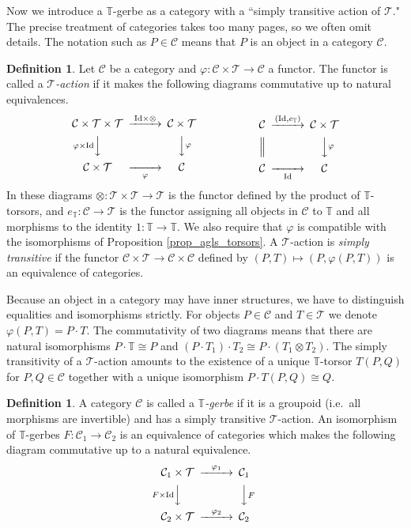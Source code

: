 \documentclass[a4paper,a4paper]{article}
\theoremstyle{definition}
\newtheorem{dfn}[thm]{Definition}
\theoremstyle{remark}
\newcommand{\T}{\mathbb{T}}
\newcommand{\sC}{\mathcal{C}}
\newcommand{\sT}{\mathcal{T}}
\newcommand{\Id}{\mathrm{Id}}
\begin{document}
Now we introduce a $\T$-gerbe as a category with a ``simply transitive action of $\sT$." The precise treatment of categories takes too many pages, so we often omit details. The notation such as $P \in \sC$ means that $P$ is an object in a category $\sC$.

\begin{dfn}
Let $\sC$ be a category and $\varphi : \sC \times \sT \to \sC$ a functor. The functor is called a \textit{$\sT$-action} if it makes the following diagrams commutative up to natural equivalences.
$$
\begin{CD}
\sC \times \sT \times \sT @>{\Id \times \otimes}>> \sC \times \sT \\
@V{\varphi \times \Id}VV     @VV{\varphi}V  \\
\sC \times \sT @>>{\varphi}> \sC
\end{CD}
\hspace{2cm}
\begin{CD}
\sC @>{(\Id, e_\T)}>> \sC \times \sT \\
@|     @VV{\varphi}V  \\
\sC @>>{\Id}> \sC
\end{CD}
$$
In these diagrams $\otimes : \sT \times \sT \to \sT$ is the functor defined by the product of $\T$-torsors, and $e_\T : \sC \rightarrow \sT$ is the functor assigning all objects in $\sC$ to $\T$ and all morphisms to the identity $1 : \T \to \T$. We also require that $\varphi$ is compatible with the isomorphisms of Proposition \ref{prop_agls_torsors}. A $\sT$-action is \textit{simply transitive} if the functor $\sC \times \sT \to \sC \times \sC$ defined by $(P, T) \mapsto (P, \varphi(P, T))$ is an equivalence of categories. 
\end{dfn}

Because an object in a category may have inner structures, we have to distinguish equalities and isomorphisms strictly. For objects $P \in \sC$ and $T \in \sT$ we denote $\varphi(P, T) = P \cdot T$. The commutativity of two diagrams means that there are natural isomorphisms $P \cdot \T \cong P$ and $(P \cdot T_1) \cdot T_2 \cong P \cdot (T_1 \otimes T_2)$. The simply transitivity of a $\sT$-action amounts to the existence of a unique $\T$-torsor $T(P, Q)$ for $P, Q \in \sC$ together with a unique isomorphism $P \cdot T(P, Q) \cong Q$.

\begin{dfn}
A category $\sC$ is called a \textit{$\T$-gerbe} if it is a groupoid (i.e.\ all morphisms are invertible) and has a simply transitive $\sT$-action. An isomorphism of $\T$-gerbes $F : \sC_1 \to \sC_2$ is an equivalence of categories which makes the following diagram commutative up to a natural equivalence.
$$
\begin{CD}
\sC_1 \times \sT @>{\varphi_1}>> \sC_1 \\
@V{F \times \Id}VV  @VV{F}V \\
\sC_2 \times \sT @>{\varphi_2}>> \sC_2
\end{CD}
$$
\end{dfn}
\end{document}
